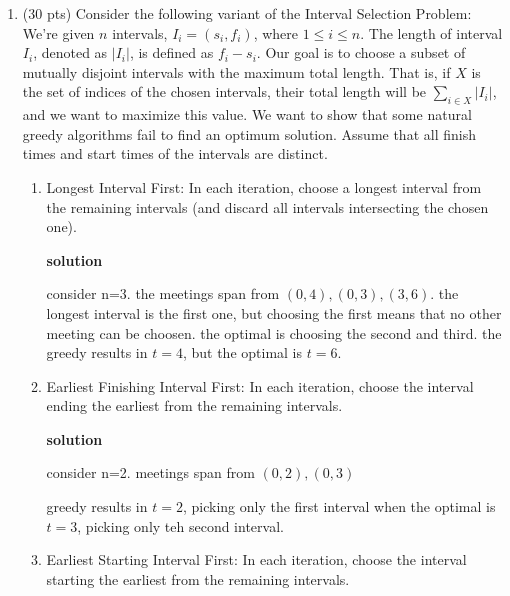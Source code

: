 \documentclass[letterpaper,12pt]{article}
\begin{document}
\begin{enumerate}
if we want to find \(jk\), we can store each hash value in a nxn matrix corresponding to the elements that lead to that value. checking the hashed value of \(A[i]\) against hte matrix for collisions should reveal the value of \(jk\) that leads to the equality. if there is a collision, assuming the hash is universal, there should be on the order of \(O(1)\) collisions so checking through each collision should take \(O(1)\) time.

\newpage



\item (30 pts) Consider the following variant of the Interval Selection Problem: We're given $n$ intervals, $I_i = (s_i, f_i)$, where $1 \leq i \leq n$. The length of interval $I_i$, denoted as $|I_i|$, is defined as $f_i - s_i$. Our goal is to choose a subset of mutually disjoint intervals with the maximum total length. That is, if $X$ is the set of indices of the chosen intervals, their total length will be $\sum_{i \in X} |I_i|$, and we want to maximize this value. We want to show that some natural greedy algorithms fail to find an optimum solution. Assume that all finish times and start times of the intervals are distinct. 

\begin{enumerate}
    \item Longest Interval First: In each iteration, choose a longest interval from the remaining intervals (and discard all intervals intersecting the chosen one). 
    
    \textbf{solution}
    
    consider n=3. the meetings span from \((0,4),(0,3),(3,6)\). the longest interval is the first one, but choosing the first means that no other meeting can be choosen. the optimal is choosing the second and third. the greedy results in \(t=4\), but the optimal is \(t=6\).

    
    \item Earliest Finishing Interval First: In each iteration, choose the interval ending the earliest from the remaining intervals.   
    
    \textbf{solution}

    consider n=2. meetings span from \((0,2),(0,3)\)

    greedy results in \(t=2\), picking only the first interval when the optimal is \(t=3\), picking only teh second interval.


    \item Earliest Starting Interval First: In each iteration, choose the interval starting  the earliest from the remaining intervals.        
    

\end{enumerate}
\end{enumerate}
\end{document}
